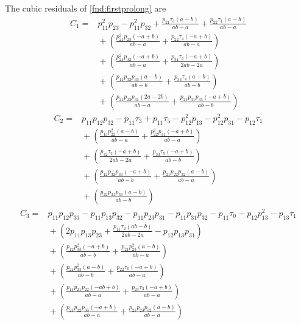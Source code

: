 \documentclass[11pt,a4paper]{article}
\numberwithin{equation}{section}
\theoremstyle{plain}
\theoremstyle{definition}
\theoremstyle{remark}
\begin{document}
The cubic residuals of \eqref{fnd:firstprolong} are
\begin{equation}\label{fnd:cubic1}
\begin{aligned}
C_1={}&p_{11}^{2} p_{23} - p_{11}^{2} p_{32} + \frac{p_{21} \tau_{3} \left(a - b\right)}{a b - a} + \frac{p_{22} \tau_{1} \left(a - b\right)}{a b - a}\\
&{}+(\frac{p_{21}^{2} p_{23} \left(- a + b\right)}{a b - a} + \frac{p_{22} \tau_{4} \left(- a + b\right)}{a b - a})\\
&{}+(\frac{p_{21}^{2} p_{32} \left(- a + b\right)}{a b - a} + \frac{p_{31} \tau_{2} \left(- a + b\right)}{2 a b - 2 a})\\
&{}+(\frac{p_{11} p_{32} p_{33} \left(a - b\right)}{a b - b} + \frac{p_{33} \tau_{4} \left(a - b\right)}{a b - b})\\
&{}+(\frac{p_{21} p_{22} p_{31} \left(2 a - 2 b\right)}{a b - a} + \frac{p_{21} p_{31} p_{33} \left(- a + b\right)}{a b - b})
\end{aligned}
\end{equation}
\begin{equation}\label{fnd:cubic2}
\begin{aligned}
C_2={}&p_{11} p_{12} p_{32} - p_{11} \tau_{3} + p_{11} \tau_{5} - p_{12}^{2} p_{13} - p_{12}^{2} p_{31} - p_{12} \tau_{1}\\
&{}+(\frac{p_{13} p_{22}^{2} \left(a - b\right)}{a b - a} + \frac{p_{22}^{2} p_{31} \left(- a + b\right)}{a b - a})\\
&{}+(\frac{p_{32} \tau_{2} \left(- a + b\right)}{2 a b - 2 a} + \frac{p_{33} \tau_{5} \left(- a + b\right)}{a b - b})\\
&{}+(\frac{p_{12} p_{32} p_{33} \left(- a + b\right)}{a b - b} + \frac{p_{21} p_{22} p_{32} \left(a - b\right)}{a b - a})\\
&{}+(\frac{p_{22} p_{31} p_{33} \left(a - b\right)}{a b - b})
\end{aligned}
\end{equation}
\begin{equation}\label{fnd:cubic3}
\begin{aligned}
C_3={}&p_{11} p_{12} p_{33} - p_{11} p_{13} p_{32} - p_{11} p_{23} p_{31} - p_{11} p_{31} p_{32} - p_{11} \tau_{0} - p_{12} p_{13}^{2} - p_{13} \tau_{1}\\
&{}+(2 p_{11} p_{13} p_{23} + \frac{p_{11} \tau_{2} \left(a b - b\right)}{2 a b - 2 a} - p_{12} p_{13} p_{31})\\
&{}+(\frac{p_{12} p_{33}^{2} \left(- a + b\right)}{a b - b} + \frac{p_{21} p_{23}^{2} \left(a - b\right)}{a b - a})\\
&{}+(\frac{p_{21} p_{33}^{2} \left(a - b\right)}{a b - b} + \frac{p_{22} \tau_{0} \left(- a + b\right)}{a b - a})\\
&{}+(\frac{p_{11} p_{21} p_{22} \left(- a b + b\right)}{a b - a} + \frac{p_{23} \tau_{3} \left(- a + b\right)}{a b - a})\\
&{}+(\frac{p_{21} p_{22} p_{33} \left(- a + b\right)}{a b - a} + \frac{p_{21} p_{23} p_{32} \left(a - b\right)}{a b - a})
\end{aligned}
\end{equation}
\end{document}
